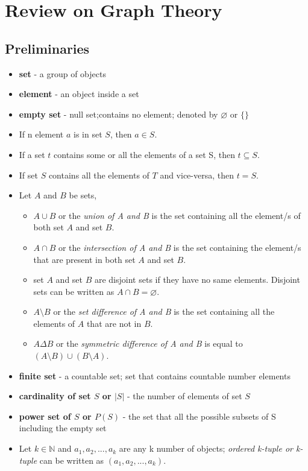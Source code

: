 \section{Review on Graph Theory  \cite{agnarsson2006graph}}
\subsection{Preliminaries}
\begin{itemize}
\item \textbf{set} - a group of objects
\item \textbf{element} - an object inside a set
\item \textbf{empty set} - null set;contains no element; denoted by $\varnothing$ or $\{\}$
\item If n element $a$ is in set $S$, then $a \in S $.
\item If a set $t$ contains some or all the elements of a set S, then $t \subseteq S$.
\item If set $S$ contains all the elements of $T$ and vice-versa, then $t=S$.
\item Let $A$ and $B$ be sets,
\begin{itemize}
	\item $A \cup B$ or the \textit{union of A and B} is the set containing all the element/s of both set $A$ and set $B$.
	\item $A \cap B$ or the \textit{intersection of A and B} is the set containing the element/s that are present in both set $A$ and set $B$.
	\item set $A$ and set $B$ are disjoint sets if they have no same elements. Disjoint sets can be written as $A \cap B=\varnothing$.
	\item $A \setminus B$ or the \textit{set difference of A and B} is the set containing all the elements of $A$ that are not in $B$.
	\item $A \Delta B$ or the \textit{symmetric difference of A and B} is equal to $(A \setminus B) \cup (B \setminus A)$. 
\end{itemize}
 \item \textbf{finite set} - a countable set; set that contains countable number elements
 \item  \textbf{cardinality of set $S$ or $|S|$} - the number of elements of set $S$
 \item \textbf{power set of $S$ or $P(S)$} - the set that all the possible subsets of S including the empty set
 \item Let $k \in \mathbb{N}$ and $a_1,a_2,...,a_k$ are any k number of objects; \textit{ordered k-tuple or k-tuple} can be written as $(a_1,a_2,...,a_k)$.

\end{itemize}
